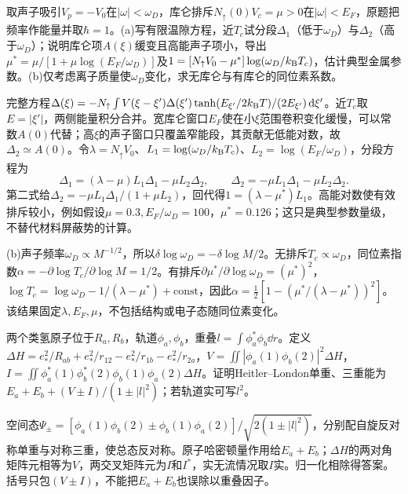 \begin{exercise}[原题1(a)--(b)]\label{p:512-9-1}
取声子吸引$V_p=-V_0$在$|\omega|<\omega_D$，库仑排斥$N_\uparrow(0)V_c=\mu>0$在$|\omega|<E_F$，原题把频率作能量并取$\hbar=1$。(a)写有限温隙方程，近$T_c$试分段$\Delta_1$（低于$\omega_D$）与$\Delta_2$（高于$\omega_D$）；说明库仑项$A(\xi)$缓变且高能声子项小，导出$\mu^*=\mu/[1+\mu\log(E_F/\omega_D)]$及$1=[N_\uparrow V_0-\mu^*]\log(\omega_D/k_{\mathrm B} T_c)$，估计典型金属参数。(b)仅考虑离子质量使$\omega_D$变化，求无库仑与有库仑的同位素系数。
\end{exercise}
\begin{solution}
完整方程$\Delta(\xi)=-N_\uparrow\int V(\xi-\xi')\Delta(\xi')\tanh(E_{\xi'}/2k_{\mathrm B} T)/(2E_{\xi'})\,\mathrm d\xi'$。近$T_c$取$E=|\xi'|$，两侧能量积分合并。宽库仑窗口$E_F$使在小$\xi$范围卷积变化缓慢，可以常数$A(0)$代替；高$\xi$的声子窗口只覆盖窄能段，其贡献无低能对数，故$\Delta_2\simeq A(0)$。令$\lambda=N_\uparrow V_0$、$L_1=\log(\omega_D/k_{\mathrm B} T_c)$、$L_2=\log(E_F/\omega_D)$，分段方程为
\begin{equation}
\Delta_1=(\lambda-\mu)L_1\Delta_1-\mu L_2\Delta_2,\qquad\Delta_2=-\mu L_1\Delta_1-\mu L_2\Delta_2.
\end{equation}
第二式给$\Delta_2=-\mu L_1\Delta_1/(1+\mu L_2)$，回代得$1=(\lambda-\mu^*)L_1$。高能对数使有效排斥较小，例如假设$\mu=0.3,E_F/\omega_D=100$，$\mu^*=0.126$；这只是典型参数量级，不替代材料屏蔽势的计算。

(b)声子频率$\omega_D\propto M^{-1/2}$，所以$\delta\log\omega_D=-\delta\log M/2$。无排斥$T_c\propto\omega_D$，同位素指数$\alpha=-\partial\log T_c/\partial\log M=1/2$。有排斥$\partial\mu^*/\partial\log\omega_D=(\mu^*)^2$，$\log T_c=\log\omega_D-1/(\lambda-\mu^*)+\mathrm{const}$，因此$\alpha=\frac12[1-(\mu^*/(\lambda-\mu^*))^2]$。该结果固定$\lambda,E_F,\mu$，不包括结构或电子态随同位素变化。
\end{solution}
\begin{exercise}[原题2]\label{p:512-9-2}
两个类氢原子位于$R_a,R_b$，轨道$\phi_a,\phi_b$，重叠$l=\int\phi_a^*\phi_b\dd r$。定义$\Delta H=e_*^2/R_{ab}+e_*^2/r_{12}-e_*^2/r_{1b}-e_*^2/r_{2a}$，$V=\iint|\phi_a(1)\phi_b(2)|^2\Delta H$，$I=\iint\phi_a^*(1)\phi_b^*(2)\phi_b(1)\phi_a(2)\Delta H$。证明Heitler--London单重、三重能为$E_a+E_b+(V\pm I)/(1\pm|l|^2)$；若轨道实可写$l^2$。
\end{exercise}
\begin{solution}
空间态$\Psi_\pm=[\phi_a(1)\phi_b(2)\pm\phi_b(1)\phi_a(2)]/\sqrt{2(1\pm|l|^2)}$，分别配自旋反对称单重与对称三重，使总态反对称。原子哈密顿量作用给$E_a+E_b$；$\Delta H$的两对角矩阵元相等为$V$，两交叉矩阵元为$I$和$I^*$，实无流情况取$I$实。归一化相除得答案。括号只包$(V\pm I)$，不能把$E_a+E_b$也误除以重叠因子。
\end{solution}
